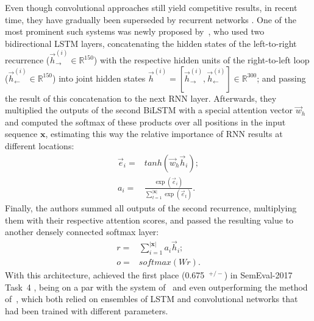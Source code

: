 Even though convolutional approaches still yield competitive results,
in recent time, they have gradually been superseded by recurrent
networks \cite{Xu:16,Wang:15}.  One of the most prominent such systems
was newly proposed by~\citet{Baziotis:17}, who used two bidirectional
LSTM layers, concatenating the hidden states of the left-to-right
recurrence ($\vec{h}^{(i)}_{\rightarrow}\in\mathbb{R}^{150}$) with the
respective hidden units of the right-to-left loop
($\vec{h}^{(i)}_{\leftarrow}\in\mathbb{R}^{150}$) into joint hidden
states
$\vec{h}^{(i)} = [\vec{h}^{(i)}_{\rightarrow},
\vec{h}^{(i)}_{\leftarrow}]\in\mathbb{R}^{300}$; and passing the
result of this concatenation to the next RNN layer.  Afterwards, they
multiplied the outputs of the second BiLSTM with a special attention
vector $\vec{w}_h$ and computed the softmax of these products over all
positions in the input sequence $\mathbf{x}$, estimating this way the
relative importance of RNN results at different locations:
\begin{align}
  \vec{e}_i =& tanh\left(\vec{w}_h\vec{h}_i\right);\\
  a_i =& \frac{\exp(\vec{e}_i)}{\sum_{t=1}^{|\mathbf{x}|}\exp(\vec{e}_t)}.
\end{align}
Finally, the authors summed all outputs of the second recurrence,
multiplying them with their respective attention scores, and passed
the resulting value to another densely connected softmax layer:
\begin{align}
  r =& \sum_{i=1}^{|\mathbf{x}|}a_i\vec{h}_i;\\
  o =& softmax\left(W r\right).
\end{align}
With this architecture, \citet{Baziotis:17} achieved the first place
(0.675~\F{}$^{+/-}$) in SemEval-2017 Task~4 \cite{Rosenthal:17}, being
on a par with the system of~\citet{Cliche:17} and even outperforming
the method of~\citet{Rouvier:17}, which both relied on ensembles of
LSTM and convolutional networks that had been trained with different
parameters.


